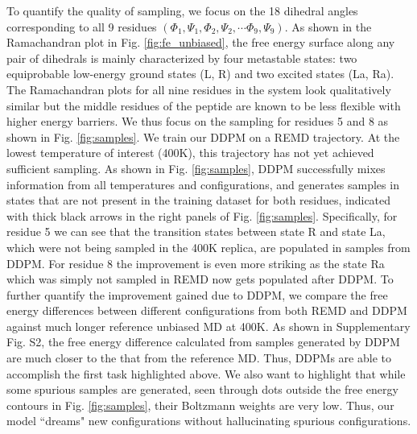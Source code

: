 \documentclass[9pt,twocolumn,twoside]{pnas-new}
\newcommand{\yh}{\textcolor{green}}
\begin{document}


 To quantify the quality of sampling, we focus on the 18 dihedral angles corresponding to all 9 residues $(\Phi_1, \Psi_1, \Phi_2, \Psi_2, \cdots \Phi_9, \Psi_9)$. As shown in the Ramachandran plot in Fig. \ref{fig:fe_unbiased}, the free energy surface along any pair of dihedrals is mainly characterized by four metastable states: two equiprobable low-energy ground states (L, R) and two excited states (La, Ra). The Ramachandran plots for all nine residues in the system look qualitatively similar but the middle residues of the peptide are known to be less flexible with higher energy barriers.\cite{biswas2018metadynamics, SPIB_AIB9} We thus focus on the sampling for residues 5 and 8 as shown in Fig. \ref{fig:samples}. We train our DDPM on a REMD trajectory. At the lowest temperature of interest (400K), this trajectory has not yet achieved sufficient sampling. As shown in Fig. \ref{fig:samples}, DDPM successfully mixes information from all temperatures and configurations, and generates samples in states that are not present in the training dataset for both residues, indicated with thick black arrows in the right panels of Fig. \ref{fig:samples}. Specifically, for residue 5 we can see that the transition states between state R and state La, which were not being sampled in the 400K replica, are populated in samples from DDPM. For residue 8 the improvement is even more striking as the state Ra which was simply not sampled in REMD now gets populated after DDPM. To further quantify the improvement gained due to DDPM, we compare the free energy differences between different configurations from both REMD and DDPM against much longer reference unbiased MD at 400K. As shown in Supplementary Fig. S2, the free energy difference calculated from samples generated by DDPM are much closer to the that from the reference MD. Thus, DDPMs are able to accomplish the first task highlighted above. We also want to highlight that while some spurious samples are generated, seen through dots outside the free energy contours in Fig. \ref{fig:samples}, their Boltzmann weights are very low. Thus, our model ``dreams" new configurations without hallucinating spurious configurations.
 
\end{document}
